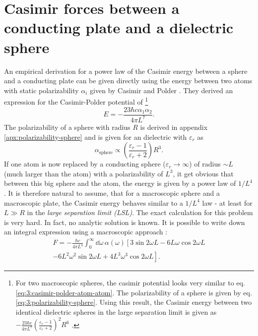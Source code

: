 \section{Casimir forces between a conducting plate and a dielectric sphere}
\label{sec:3:casimir-plate-sphere}

An empirical derivation for a power law of the Casimir energy between a sphere and a conducting plate can be given directly using the energy between two atoms with static polarizability $\alpha_i$ given by Casimir and Polder \cite{Casimir_1948a}.
They derived an expression for the Casimir-Polder potential of \footnote{For two macroscopic spheres, the casimir potential looks very similar to eq. \eqref{eq:3:casimir-polder-atom-atom}. The polarizability of a sphere is given by eq. \eqref{eq:3:polarizability-sphere}. Using this result, the Casimir energy between two identical dielectric spheres in the large separation limit is given as $-\frac{23\hbar c}{4\pi L^7}\left(\frac{\varepsilon_r-1}{\varepsilon_r+2}\right)^2R^6$ \cite{Emig_2007}.}
\begin{equation}\label{eq:3:casimir-polder-atom-atom}
  E = -\frac{23\hbar c \alpha_1 \alpha_2}{4 \pi L^7} .
\end{equation}
The polarizability of a sphere with radius $R$ is derived in appendix \ref{apx:polarizability-sphere} and is given for an dielectric with $\varepsilon_r$ as 
\begin{equation} \label{eq:3:polarizability-sphere}
  \alpha_\mathrm{sphere} \propto \left(\frac{\varepsilon_r-1}{\varepsilon_r+2}\right)R^3 .
\end{equation}
If one atom is now replaced by a conducting sphere ($\varepsilon_r \rightarrow \infty$) of radius $\sim L$ (much larger than the atom) with a polarizability of $L^3$, it get obvious that between this big sphere and the atom, the energy is given by a power law of $1/L^4$.
It is therefore natural to assume, that for a macroscopic sphere and a macroscopic plate, the Casimir energy behaves similar to a $1/L^4$ law - at least for $L\gg R$ in the \emph{large separation limit (LSL)}.
The exact calculation for this problem is very hard. In fact, no analytic solution is known.
It is possible to write down an integral expression using a macroscopic approach \cite{Ford_1998}:
\begin{multline}
  F = - \frac{\hbar c}{4 \pi L^4} \int_{0}^{\infty} \dd \omega \, \alpha(\omega) \left[3\sin 2 \omega L - 6L\omega \cos 2 \omega L \right. \\ 
  \left. - 6L^2\omega^2 \sin 2 \omega L + 4L^3\omega^3 \cos 2 \omega L\right].
\end{multline}
